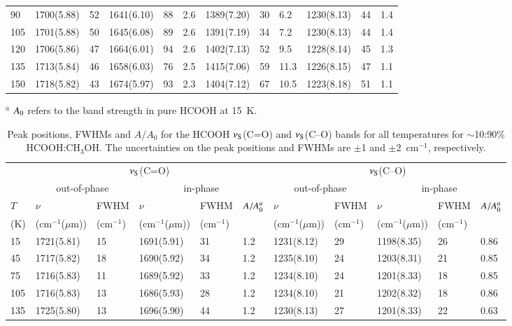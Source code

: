 \documentclass{aa}
\begin{document}
\begin{appendix}
\begin{table*}
\begin{center}
\begin{tabular}{l|lllll|lll|lll}
90           & 1700(5.88) & 52 & 1641(6.10) & 88 & 2.6 & 1389(7.20) &  30 & 6.2 & 1230(8.13) & 44 & 1.4\\
105          & 1701(5.88) & 50 & 1645(6.08) & 89 & 2.6 & 1391(7.19) &  34 & 7.2 & 1230(8.13) & 44 & 1.4\\
120          & 1706(5.86) & 47 & 1664(6.01) & 94 & 2.6 & 1402(7.13) &  52 & 9.5 & 1228(8.14) & 45 & 1.3\\
135          & 1713(5.84) & 46 & 1658(6.03) & 76 & 2.5 & 1415(7.06) &  59 &11.3 & 1226(8.15) & 47 & 1.1\\
150          & 1718(5.82) & 43 & 1674(5.97) & 93 & 2.3 & 1404(7.12) &  67 &10.5 & 1223(8.18) & 51 & 1.1\\
\hline	     		    
\end{tabular}
\end{center}

$^a$ $A_{\rm0}$ refers to the band strength in pure HCOOH at 15~K.

\end{table*}

\begin{table*}
\caption{Peak positions, FWHMs and $A/A_0$ for the HCOOH $\nu_{\rm
 S}$(C=O) and $\nu_{\rm S}$(C--O) bands for all temperatures for
 $\sim$10:90\% HCOOH:CH$_3$OH. The uncertainties on the peak positions
 and FWHMs are $\pm$1 and $\pm$2~cm$^{-1}$,
 respectively.}\label{pp_hcooh-ch3oh}
\begin{center}
\begin{tabular}{l|lllll|lllll}
\hline
\hline
             & \multicolumn{5}{c|}{$\nu_{\rm S}$(C=O)} &  \multicolumn{5}{c}{$\nu_{\rm S}$(C--O)}\\
             & \multicolumn{2}{c}{out-of-phase} &\multicolumn{3}{c|}{in-phase} & \multicolumn{2}{c}{out-of-phase} &\multicolumn{3}{c|}{in-phase}\\
 $T$         & $\nu$ & FWHM & $\nu$ & FWHM & $A/A_{\rm 0}^a$ & $\nu$ & FWHM & $\nu$ & FWHM & $A/A_{\rm 0}^a$\\
 (K)           & (cm$^{-1}$($\mu$m)) & (cm$^{-1}$) & (cm$^{-1}$($\mu$m)) & (cm$^{-1}$) & & (cm$^{-1}$($\mu$m)) & (cm$^{-1}$)& (cm$^{-1}$($\mu$m)) & (cm$^{-1}$)& \\ 
\hline
15           & 1721(5.81) & 15 & 1691(5.91) & 31 & 1.2 & 1231(8.12) & 29 & 1198(8.35) & 26 & 0.86\\  
45           & 1717(5.82) & 18 & 1690(5.92) & 34 & 1.2 & 1235(8.10) & 24 & 1203(8.31) & 21 & 0.85\\  
75           & 1716(5.83) & 11 & 1689(5.92) & 33 & 1.2 & 1234(8.10) & 24 & 1201(8.33) & 18 & 0.85\\  
105          & 1716(5.83) & 13 & 1686(5.93) & 28 & 1.2 & 1234(8.10) & 21 & 1202(8.32) & 18 & 0.86\\  
135          & 1725(5.80) & 13 & 1696(5.90) & 44 & 1.2 & 1230(8.13) & 27 & 1201(8.33) & 22 & 0.63\\  
\hline
\end{tabular}
\end{center}


\end{table*}
\end{appendix}
\end{document}
